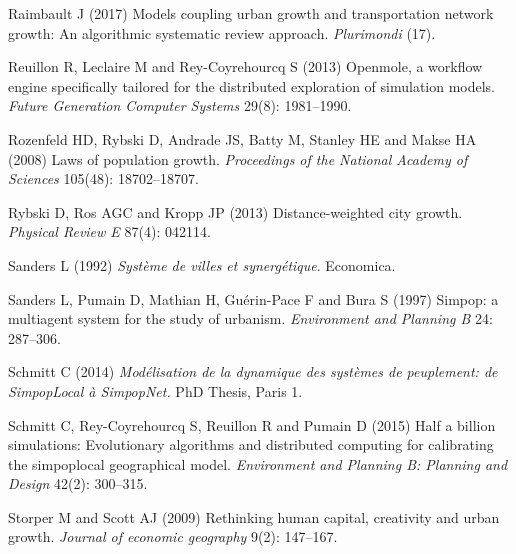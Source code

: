 \documentclass[Royal,sageh,times]{sagej}
\begin{document}
\begin{thebibliography}{51}
Raimbault J (2017) Models coupling urban growth and transportation network
  growth: An algorithmic systematic review approach.
\newblock \emph{Plurimondi} (17).

Reuillon R, Leclaire M and Rey-Coyrehourcq S (2013) Openmole, a workflow engine
  specifically tailored for the distributed exploration of simulation models.
\newblock \emph{Future Generation Computer Systems} 29(8): 1981--1990.

Rozenfeld HD, Rybski D, Andrade JS, Batty M, Stanley HE and Makse HA (2008)
  Laws of population growth.
\newblock \emph{Proceedings of the National Academy of Sciences} 105(48):
  18702--18707.

Rybski D, Ros AGC and Kropp JP (2013) Distance-weighted city growth.
\newblock \emph{Physical Review E} 87(4): 042114.

Sanders L (1992) \emph{Syst{\`e}me de villes et synerg{\'e}tique}.
\newblock Economica.

Sanders L, Pumain D, Mathian H, Gu{\'e}rin-Pace F and Bura S (1997) Simpop: a
  multiagent system for the study of urbanism.
\newblock \emph{Environment and Planning B} 24: 287--306.

Schmitt C (2014) \emph{Mod{\'e}lisation de la dynamique des syst{\`e}mes de
  peuplement: de SimpopLocal {\`a} SimpopNet.}
\newblock PhD Thesis, Paris 1.

Schmitt C, Rey-Coyrehourcq S, Reuillon R and Pumain D (2015) Half a billion
  simulations: Evolutionary algorithms and distributed computing for
  calibrating the simpoplocal geographical model.
\newblock \emph{Environment and Planning B: Planning and Design} 42(2):
  300--315.

Storper M and Scott AJ (2009) Rethinking human capital, creativity and urban
  growth.
\newblock \emph{Journal of economic geography} 9(2): 147--167.


\end{thebibliography}
\end{document}
